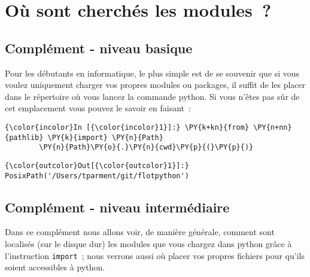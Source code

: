     
    
    
    

    

    \hypertarget{ouxf9-sont-cherchuxe9s-les-modules}{%
\section{Où sont cherchés les
modules~?}\label{ouxf9-sont-cherchuxe9s-les-modules}}

    \hypertarget{compluxe9ment---niveau-basique}{%
\subsection{Complément - niveau
basique}\label{compluxe9ment---niveau-basique}}

    Pour les débutants en informatique, le plus simple est de se souvenir
que si vous voulez uniquement charger vos propres modules ou packages,
il suffit de les placer dans le répertoire où vous lancez la commande
python. Si vous n'êtes pas sûr de cet emplacement vous pouvez le savoir
en faisant~:

    \begin{Verbatim}[commandchars=\\\{\},frame=single,framerule=0.3mm,rulecolor=\color{cellframecolor}]
{\color{incolor}In [{\color{incolor}1}]:} \PY{k+kn}{from} \PY{n+nn}{pathlib} \PY{k}{import} \PY{n}{Path}
        \PY{n}{Path}\PY{o}{.}\PY{n}{cwd}\PY{p}{(}\PY{p}{)}
\end{Verbatim}


\begin{Verbatim}[commandchars=\\\{\},frame=single,framerule=0.3mm,rulecolor=\color{cellframecolor}]
{\color{outcolor}Out[{\color{outcolor}1}]:} PosixPath('/Users/tparment/git/flotpython')
\end{Verbatim}
            
    \hypertarget{compluxe9ment---niveau-intermuxe9diaire}{%
\subsection{Complément - niveau
intermédiaire}\label{compluxe9ment---niveau-intermuxe9diaire}}

    Dans ce complément nous allons voir, de manière générale, comment sont
localisés (sur le disque dur) les modules que vous chargez dans python
grâce à l'instruction \texttt{import}~; nous verrons aussi où placer vos
propres fichiers pour qu'ils soient accessibles à python.

